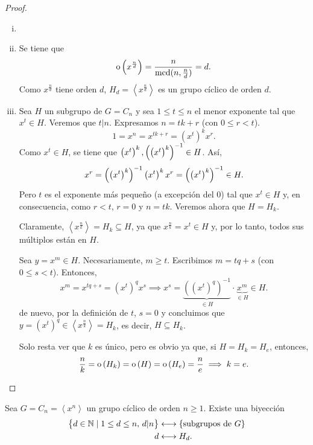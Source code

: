 \begin{proof}
    \begin{enumerate}[i)]
        \item[]
        \item Se tiene que
            \[
                \operatorname{o}\left( x^{\frac{n}{d}} \right) = \frac{n}{\operatorname{mcd}(n, \frac{n}{d})} = d.
            \]
            Como $x^{\frac{n}{d}}$ tiene orden $d$, $H_d = \left< x^{\frac{n}{d}} \right>$ es un grupo
            cíclico de orden $d$.
        \item Sea $H$ un subgrupo de $G = C_n$ y sea $1 \leq t \leq n$ el menor exponente tal que 
            $x^t \in H$. Veremos que $t \vert n$. Expresamos $n = tk + r$ (con $0 \leq r < t$).
            \[
                1 = x^n = x^{tk + r} = \left( x^t \right)^k x^r.
            \]
            Como $x^t\in H$, se tiene que $\left( x^t\right)^k, \left( \left( x^t\right)^k \right) ^{-1} \in H$. Así,
            \[
                x^r=\left( \left( x^t\right)^k \right) ^{-1} \left( x^t\right)^k x^r = \left( \left( x^t\right)^k \right) ^{-1} \in H.
            \]
            Pero $t$ es el exponente más pequeño (a excepción del 0) tal que $x^t\in H$ y, en consecuencia, como $r<t$, $r = 0$ y $n = tk$.
            Veremos ahora que $H = H_k$.
            
            Claramente, $\left< x^{\frac{n}{k}} \right> = H_k \subseteq H$, ya que $x^{\frac{n}{k}} = x^t \in H$
            y, por lo tanto, todos sus múltiplos están en $H$.

            Sea $y = x^m \in H$. Necesariamente, $m\geq t$. Escribimos $m = tq + s$
            (con $0 \leq s < t$). Entonces,
            \[
                x^m = x^{tq + s} = \left( x^t \right)^q x^s \implies
                x^s = \underbrace{\left( \left( x^t \right)^q \right)^{-1}}_{\in H} \cdot
                \underbrace{x^m}_{\in H} \in H.
            \]
            de nuevo, por la definición de $t$, $s = 0$ y concluimos que $y = \left( x^t \right)^q \in 
            \left< x^{\frac{n}{k}} \right> = H_k$, es decir, $H \subseteq H_k$.

            Solo resta ver que $k$ es único, pero es obvio ya que, si $H = H_k = H_e$, entonces,
            \[
                \frac{n}{k} = \operatorname{o}\left( H_k \right) = \operatorname{o}\left( H \right)  = \operatorname{o}\left( H_e \right)  = \frac{n}{e}\implies
                k = e.
            \]
    \end{enumerate}
\end{proof}

\begin{col}
    Sea $G = C_n = \left< x^n \right>$ un grupo cíclico de orden $n \geq 1$. Existe una biyección
    \[
        \begin{aligned}
            \left\{d \in \mathbb{N} \mid 1 \leq d \leq n,\, d \vert n \right\} &\longleftrightarrow
            \left\{\text{subgrupos de }G\right\} \\
            d &\longleftrightarrow H_d.
        \end{aligned}
    \]
\end{col}

